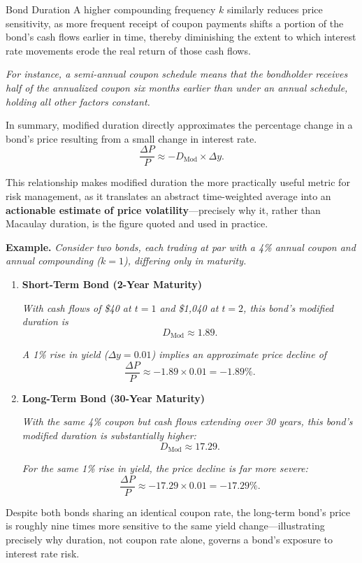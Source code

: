 \documentclass[10pt]{article}
\begin{document}
\begin{core}[label=core:bond_duration]{Bond Duration}
      A higher compounding frequency $k$ similarly reduces price sensitivity, as more frequent receipt of coupon payments shifts a portion of the bond's cash flows earlier in time, thereby diminishing the extent to which interest rate movements erode the real return of those cash flows.

      \textit{For instance, a semi-annual coupon schedule means that the bondholder receives half of the annualized coupon six months earlier than under an annual schedule, holding all other factors constant.}

      In summary, modified duration directly approximates the percentage change in a bond's price resulting from a small change in interest rate.
      \[
        \frac{\Delta P}{P} \approx -D_{\text{Mod}} \times \Delta y.
      \]

      This relationship makes modified duration the more practically useful metric for risk management, as it translates an abstract time-weighted average into an \textbf{actionable estimate of price volatility}---precisely why it, rather than Macaulay duration, is the figure quoted and used in practice.

      \textbf{Example.} \textit{Consider two bonds, each trading at par with a 4\% annual coupon and annual compounding ($k=1$), differing only in maturity.}

      \begin{enumerate}

        \item \textbf{Short-Term Bond (2-Year Maturity)}

        \textit{With cash flows of \$40 at $t=1$ and \$1{,}040 at $t=2$, this bond's modified duration is}
        \[
          D_{\text{Mod}} \approx 1.89.
        \]

        \textit{A 1\% rise in yield ($\Delta y = 0.01$) implies an approximate price decline of}
        \[
          \frac{\Delta P}{P} \approx -1.89 \times 0.01 = -1.89\%.
        \]

        \item \textbf{Long-Term Bond (30-Year Maturity)}

        \textit{With the same 4\% coupon but cash flows extending over 30 years, this bond's modified duration is substantially higher:}
        \[
          D_{\text{Mod}} \approx 17.29.
        \]

        \textit{For the same 1\% rise in yield, the price decline is far more severe:}
        \[
          \frac{\Delta P}{P} \approx -17.29 \times 0.01 = -17.29\%.
        \]

      \end{enumerate}

      Despite both bonds sharing an identical coupon rate, the long-term bond's price is roughly nine times more sensitive to the same yield change---illustrating precisely why duration, not coupon rate alone, governs a bond's exposure to interest rate risk.

    \end{core}
\end{document}
